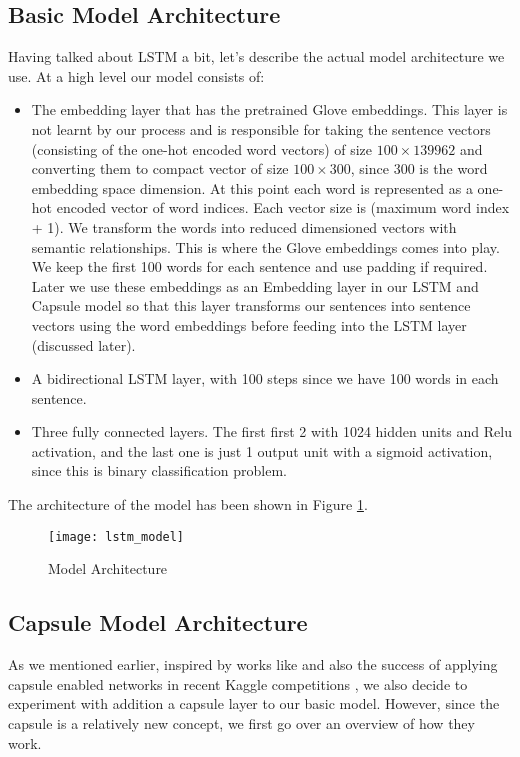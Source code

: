 \documentclass[11pt,twocolumn,letterpaper]{article}
\begin{document}
\subsection{Basic Model Architecture}

Having talked about LSTM a bit, let's describe the actual model architecture we use. At a high level our model consists of:

\begin{itemize}
  \item The embedding layer that has the pretrained Glove embeddings. This layer is not learnt by our process and is responsible for taking the sentence vectors (consisting of the one-hot encoded word vectors) of size $100\times139962$ and converting them to compact vector of size $100\times300$, since 300 is the word embedding space dimension. At this point each word is represented as a one-hot encoded vector of word indices. Each vector size is (maximum word index + 1). We transform the words into reduced dimensioned vectors with semantic relationships.  This is where the Glove embeddings comes into play. We keep the first 100 words for each sentence and use padding if required. Later we use these embeddings as an Embedding layer in our LSTM and Capsule model so that this layer transforms our sentences into sentence vectors using the word embeddings before feeding into the LSTM layer (discussed later).
  \item A bidirectional LSTM layer, with 100 steps since we have 100 words in each sentence.
  \item Three fully connected layers. The first first 2 with 1024 hidden units and Relu activation, and the last one is just 1 output unit with a sigmoid activation, since this is binary classification problem.
\end{itemize}

The architecture of the model has been shown in Figure \ref{fig:lstm_model}.

\begin{figure}[h]
\texttt{[image: lstm\_model]}
\caption{Model Architecture}
\label{fig:lstm_model}
\centering
\end{figure}

\subsection{Capsule Model Architecture} \label{basic_model}

As we mentioned earlier, inspired by works like \cite{capsule2} and also the success of applying capsule enabled networks in recent Kaggle competitions \cite{Kaggle2}, we also decide to experiment with addition a capsule layer to our basic model. However, since the capsule is a relatively new concept, we first go over an overview of how they work.
\end{document}
